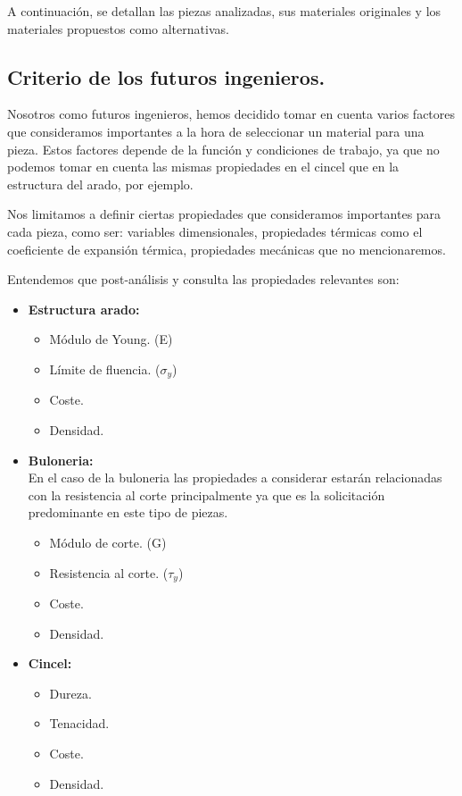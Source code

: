 \documentclass[15pt,a4paper]{article}
\begin{document}
A continuación, se detallan las piezas analizadas, sus materiales originales y los materiales propuestos como alternativas.

\subsection{Criterio de los futuros ingenieros.}

Nosotros como futuros ingenieros, hemos decidido tomar en cuenta varios factores que consideramos importantes a la hora de seleccionar un material para una pieza. Estos factores depende de la función y condiciones de trabajo, ya que no podemos tomar en cuenta las mismas propiedades en el cincel que en la estructura del arado, por ejemplo.

Nos limitamos a definir ciertas propiedades que consideramos importantes para cada pieza, como ser: variables dimensionales, propiedades térmicas como el coeficiente de expansión térmica, propiedades mecánicas que no mencionaremos. 

Entendemos que post-análisis y consulta las propiedades relevantes son:

\begin{itemize}
    \item \textbf{Estructura arado:}
    \begin{itemize}
        \item Módulo de Young. (E)
        \item Límite de fluencia. ($\sigma_{y}$)
        \item Coste.
        \item Densidad.
    \end{itemize}
    \item \textbf{Buloneria:}\\
En el caso de la buloneria las propiedades a considerar estarán relacionadas con la resistencia al corte principalmente ya que es la solicitación predominante en este tipo de piezas.
    \begin{itemize}
        \item Módulo de corte. (G)
        \item Resistencia al corte. ($\tau_{y}$)
        \item Coste.
        \item Densidad.
    \end{itemize}
    \item \textbf{Cincel:}
    \begin{itemize}
        \item Dureza.
        \item Tenacidad.
        \item Coste.
        \item Densidad.
    \end{itemize}
\end{itemize}
\end{document}
